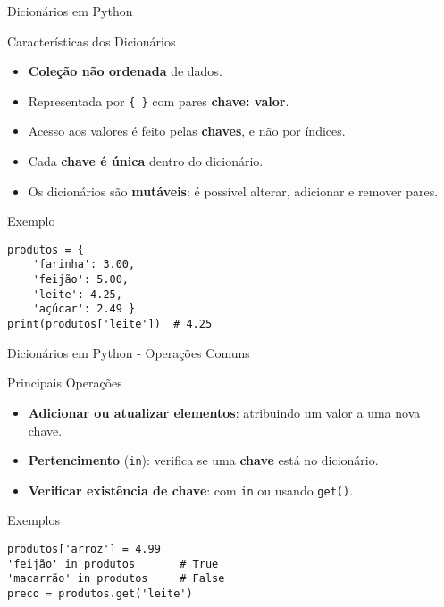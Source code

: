 \begin{frame}[fragile]{Dicionários em Python}

\begin{block}{Características dos Dicionários}
\begin{itemize}
    \item \textbf{Coleção não ordenada} de dados.
    \item Representada por \texttt{\{ \}} com pares \textbf{chave: valor}.
    \item Acesso aos valores é feito pelas \textbf{chaves}, e não por índices.
    \item Cada \textbf{chave é única} dentro do dicionário.
    \item Os dicionários são \textbf{mutáveis}: é possível alterar, adicionar e remover pares.
\end{itemize}
\end{block}

\vspace{0.5em}

\begin{block}{Exemplo}
\begin{verbatim}
produtos = {
    'farinha': 3.00,
    'feijão': 5.00,
    'leite': 4.25,
    'açúcar': 2.49 }
print(produtos['leite'])  # 4.25
\end{verbatim}
\end{block}

\end{frame}

\begin{frame}[fragile]{Dicionários em Python - Operações Comuns}


    \begin{block}{Principais Operações}
        \begin{itemize}
            \item \textbf{Adicionar ou atualizar elementos}: atribuindo um valor a uma nova chave.
            \item \textbf{Pertencimento} (\texttt{in}): verifica se uma \textbf{chave} está no dicionário.
            \item \textbf{Verificar existência de chave}: com \texttt{in} ou usando \texttt{get()}.
        \end{itemize}
    \end{block}


    \begin{block}{Exemplos}
\begin{verbatim}
produtos['arroz'] = 4.99
'feijão' in produtos       # True
'macarrão' in produtos     # False
preco = produtos.get('leite')
\end{verbatim}
    \end{block}


\end{frame}

